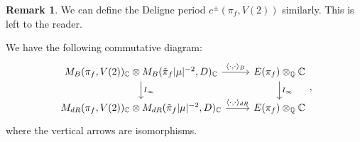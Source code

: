 \documentclass[11pt, a4paper]{amsart}
\theoremstyle{plain}
\theoremstyle{definition}
\newtheorem{remark}[theorem]{Remark}
\numberwithin{equation}{section}
\def\CC{\mathbb{C}}
\def\QQ{\mathbb{Q}}
\begin{document}
\begin{remark}
    We can define the Deligne period $c^{\pm}(\pi_f, V(2))$ similarly. This is left to the reader.
\end{remark}

 We have the following commutative diagram: 
    \begin{equation}{\label{commutative diagram_pairing}}
        \begin{tikzcd}
            M_B(\pi_f, V(2))_{\CC} \otimes M_{B}(\tilde{\pi}_{f}|\mu|^{-2}, D)_{\CC}  \ar[r, "{\langle \cdot, \cdot \rangle_{B}}"] \ar[d, "I_{\infty}"] &  E(\pi_f) \otimes_{\QQ} {\CC} \ar[d, "{I_{\infty}}"]  \\
             M_{dR}(\pi_f, V(2))_{\CC} \otimes M_{dR}(\tilde{\pi}_{f}|\mu|^{-2}, D)_{\CC} \ar[r, "{\langle \cdot, \cdot \rangle_{dR}}"] & E(\pi_f) \otimes_{\QQ} \CC 
        \end{tikzcd}, 
    \end{equation}
where the vertical arrows are isomorphisms. 
\end{document}
